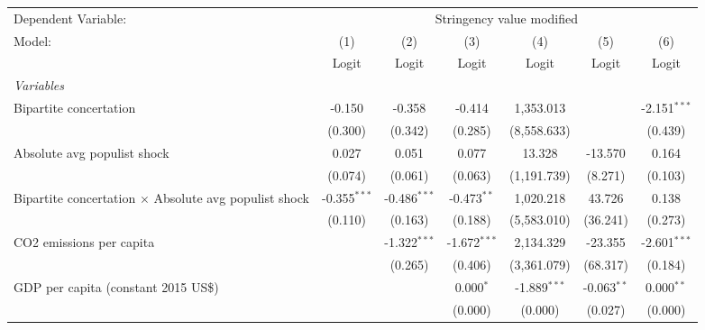 
\begingroup
\centering
\begin{tabular}{lcccccc}
   \toprule
   Dependent Variable: & \multicolumn{6}{c}{Stringency value modified}\\
   Model:                                                       & (1)            & (2)            & (3)            & (4)            & (5)              & (6)\\  
                                                                &  Logit         & Logit          & Logit          & Logit          & Logit            & Logit\\  
   \midrule
   \emph{Variables}\\
   Bipartite concertation                                       & -0.150         & -0.358         & -0.414         & 1,353.013      &                  & -2.151$^{***}$\\   
                                                                & (0.300)        & (0.342)        & (0.285)        & (8,558.633)    &                  & (0.439)\\   
   Absolute avg populist shock                                  & 0.027          & 0.051          & 0.077          & 13.328         & -13.570          & 0.164\\   
                                                                & (0.074)        & (0.061)        & (0.063)        & (1,191.739)    & (8.271)          & (0.103)\\   
   Bipartite concertation $\times$ Absolute avg populist shock  & -0.355$^{***}$ & -0.486$^{***}$ & -0.473$^{**}$  & 1,020.218      & 43.726           & 0.138\\   
                                                                & (0.110)        & (0.163)        & (0.188)        & (5,583.010)    & (36.241)         & (0.273)\\   
   CO2 emissions per capita                                     &                & -1.322$^{***}$ & -1.672$^{***}$ & 2,134.329      & -23.355          & -2.601$^{***}$\\   
                                                                &                & (0.265)        & (0.406)        & (3,361.079)    & (68.317)         & (0.184)\\   
   GDP per capita (constant 2015 US\$)                          &                &                & 0.000$^{*}$    & -1.889$^{***}$ & -0.063$^{**}$    & 0.000$^{**}$\\   
                                                                &                &                & (0.000)        & (0.000)        & (0.027)          & (0.000)\\   

\end{tabular}
